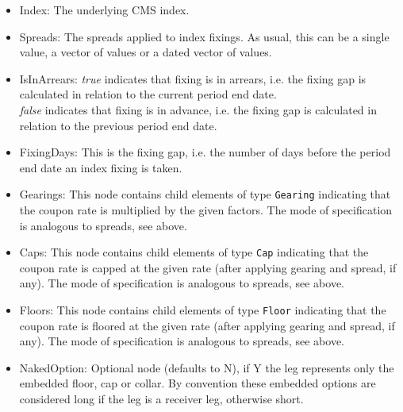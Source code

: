 \begin{itemize}
\item Index: The underlying CMS index.
\item Spreads: The spreads applied to index fixings. As usual, this can be a single value, a vector of values or a dated vector of
  values.
\item IsInArrears:  \emph{true} indicates that  fixing is in arrears,
  i.e. the fixing gap is calculated in relation to the current period
  end date.\\ \emph{false} indicates that  fixing is in advance,
  i.e. the fixing gap is calculated in relation to the previous period
  end date.  
\item FixingDays: This is the fixing gap, i.e. the number of days
  before the period end date an index fixing is taken.   
\item Gearings: This node contains child elements of type \lstinline!Gearing! indicating that the coupon rate is
  multiplied by the given factors. The mode of specification is analogous to spreads, see above.
\item Caps: This node contains child elements of type \lstinline!Cap! indicating that the coupon rate is capped at the
  given rate (after applying gearing and spread, if any). The mode of specification is analogous to spreads, see above.
\item Floors: This node contains child elements of type \lstinline!Floor! indicating that the coupon rate is floored at
  the given rate (after applying gearing and spread, if any). The mode of specification is analogous to spreads, see
  above.
\item NakedOption: Optional node (defaults to N), if Y the leg represents only the embedded floor, cap or collar. 
By convention these embedded options are considered long if the leg is a receiver leg, otherwise short. 
\end{itemize}

